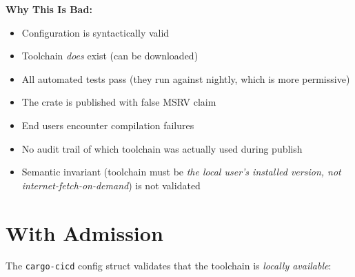 \documentclass[11pt,a4paper]{article}
\begin{document}
\textbf{Why This Is Bad:}
\begin{itemize}
  \item Configuration is syntactically valid
  \item Toolchain \emph{does} exist (can be downloaded)
  \item All automated tests pass (they run against nightly, which is more permissive)
  \item The crate is published with false MSRV claim
  \item End users encounter compilation failures
  \item No audit trail of which toolchain was actually used during publish
  \item Semantic invariant (toolchain must be \emph{the local user's installed version, not internet-fetch-on-demand}) is not validated
\end{itemize}

\section*{With Admission}

The \texttt{cargo-cicd} config struct validates that the toolchain is \emph{locally available}:
\end{document}

